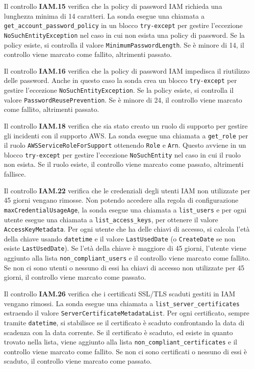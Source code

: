 Il controllo \textbf{IAM.15} verifica che la policy di password IAM richieda una lunghezza minima di 14 caratteri. La sonda esegue una chiamata a \texttt{get\_account\_password\_policy} in un blocco \texttt{try-except} per gestire l'eccezione \texttt{NoSuchEntityException} nel caso in cui non esista una policy di password. Se la policy esiste, si controlla il valore \texttt{MinimumPasswordLength}. Se è minore di 14, il controllo viene marcato come fallito, altrimenti passato.

Il controllo \textbf{IAM.16} verifica che la policy di password IAM impedisca il riutilizzo delle password. Anche in questo caso la sonda crea un blocco \texttt{try-except} per gestire l'eccezione \texttt{NoSuchEntityException}. Se la policy esiste, si controlla il valore \texttt{PasswordReusePrevention}. Se è minore di 24, il controllo viene marcato come fallito, altrimenti passato.

Il controllo \textbf{IAM.18} verifica che sia stato creato un ruolo di supporto per gestire gli incidenti con il supporto AWS. La sonda esegue una chiamata a \texttt{get\_role} per il ruolo \texttt{AWSServiceRoleForSupport} ottenendo \texttt{Role} e \texttt{Arn}. Questo avviene in un blocco \texttt{try-except} per gestire l'eccezione \texttt{NoSuchEntity} nel caso in cui il ruolo non esista. Se il ruolo esiste, il controllo viene marcato come passato, altrimenti fallisce.

Il controllo \textbf{IAM.22} verifica che le credenziali degli utenti IAM non utilizzate per 45 giorni vengano rimosse. Non potendo accedere alla regola di configurazione \texttt{maxCredentialUsageAge}, la sonda esegue una chiamata a \texttt{list\_users} e per ogni utente esegue una chiamata a \texttt{list\_access\_keys}, per ottenere il valore \texttt{AccessKeyMetadata}. Per ogni utente che ha delle chiavi di accesso, si calcola l'età della chiave usando \texttt{datetime} e il valore \texttt{LastUsedDate} (o \texttt{CreateDate} se non esiste \texttt{LastUsedDate}). Se l'età della chiave è maggiore di 45 giorni, l'utente viene aggiunto alla lista \texttt{non\_compliant\_users} e il controllo viene marcato come fallito. Se non ci sono utenti o nessuno di essi ha chiavi di accesso non utilizzate per 45 giorni, il controllo viene marcato come passato.

Il controllo \textbf{IAM.26} verifica che i certificati SSL/TLS scaduti gestiti in IAM vengano rimossi. La sonda esegue una chiamata a \texttt{list\_server\_certificates} estraendo il valore \texttt{ServerCertificateMetadataList}. Per ogni certificato, sempre tramite \texttt{datetime}, si stabilisce se il certificato è scaduto confrontando la data di scadenza con la data corrente. Se il certificato è scaduto, ed esiste in quanto trovato nella lista, viene aggiunto alla lista \texttt{non\_compliant\_certificates} e il controllo viene marcato come fallito. Se non ci sono certificati o nessuno di essi è scaduto, il controllo viene marcato come passato.

